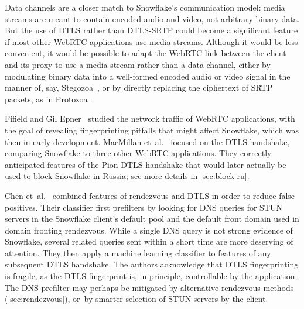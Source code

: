 \documentclass[letterpaper,twocolumn]{article}
\begin{document}
\begin{description}
Data channels are a closer match to Snowflake's communication model:
media streams are meant to contain encoded audio and video,
not arbitrary binary data.
But the use of DTLS rather than DTLS-SRTP could become
a significant feature if most other WebRTC applications use media streams.
Although it would be less convenient,
it would be possible to adapt the WebRTC link between
the client and its proxy
to use a media stream rather than a data channel,
either by modulating binary data into a well-formed encoded
audio or video signal in the manner of, say,
Stegozoa~\cite[\S 3.3]{Figueira2022a},
or by directly replacing the ciphertext of SRTP packets,
as in Protozoa~\cite[\S 4.4]{Barradas2020a}.

\end{description}

Fifield and Gil Epner~\cite{arxiv.1605.08805}
studied the network traffic of WebRTC applications,
with the goal of revealing fingerprinting pitfalls
that might affect Snowflake, which was then in early development.
MacMillan et~al.~\cite{arxiv.2008.03254}
focused on the DTLS handshake,
comparing Snowflake to three other WebRTC applications.
They correctly anticipated features
of the Pion DTLS handshake
that would later actually be used
to block Snowflake in Russia;
see more details in \autoref{sec:block-ru}.

Chen et~al.~\cite{Chen2023a}
combined features
of rendezvous and DTLS
in order to reduce false positives.
Their classifier first prefilters
by looking for DNS queries for
STUN servers in the Snowflake client's default pool
and the default front domain used in
domain fronting rendezvous.
While a single DNS query is not strong evidence of Snowflake,
several related queries sent within a short time
are more deserving of attention.
They then apply a machine learning classifier
to features of any subsequent DTLS handshake.
The authors acknowledge that DTLS fingerprinting
is fragile, as the DTLS fingerprint is, in principle,
controllable by the application.
The DNS prefilter may perhaps be mitigated
by alternative rendezvous methods (\autoref{sec:rendezvous}),
or~by smarter selection of STUN servers by the client.
\end{document}
